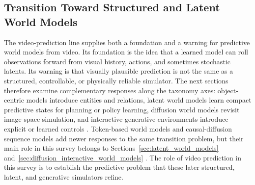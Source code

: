 \subsection{Transition Toward Structured and Latent World Models}

The video-prediction line supplies both a foundation and a warning for predictive world models from video. Its foundation is the idea that a learned model can roll observations forward from visual history, actions, and sometimes stochastic latents. Its warning is that visually plausible prediction is not the same as a structured, controllable, or physically reliable simulator. The next sections therefore examine complementary responses along the taxonomy axes: object-centric models introduce entities and relations, latent world models learn compact predictive states for planning or policy learning, diffusion world models revisit image-space simulation, and interactive generative environments introduce explicit or learned controls \cite{janner2019_o2p2_prov,hafner2019_planet_prov,hafner2020_dreamer_prov,alonso2024_diamond_prov,bruce2024_genie_prov}. Token-based world models and causal-diffusion sequence models add newer responses to the same transition problem, but their main role in this survey belongs to Sections~\ref{sec:latent_world_models} and~\ref{sec:diffusion_interactive_world_models} \cite{wu2024ivideogpt,chen2024diffusion_forcing_prov}. The role of video prediction in this survey is to establish the predictive problem that these later structured, latent, and generative simulators refine.
